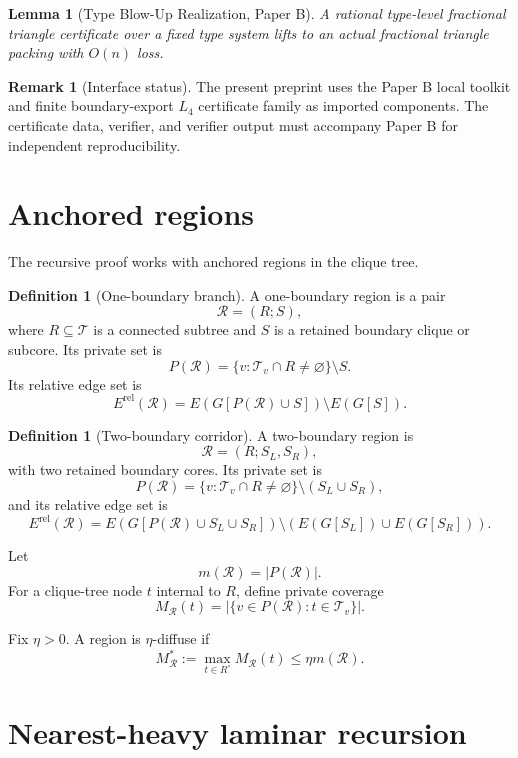 \documentclass[11pt]{article}
\newtheorem{lemma}[theorem]{Lemma}
\theoremstyle{definition}
\newtheorem{definition}[theorem]{Definition}
\newtheorem{remark}[theorem]{Remark}
\newcommand{\calT}{\mathcal T}
\newcommand{\calR}{\mathcal R}
\newcommand{\rel}{\mathrm{rel}}
\begin{document}
\begin{lemma}[Type Blow-Up Realization, Paper B]\label{lem:import-blowup}
A rational type-level fractional triangle certificate over a fixed type system lifts to an actual fractional triangle packing with \(O(n)\) loss.
\end{lemma}

\begin{remark}[Interface status]
The present preprint uses the Paper B local toolkit and finite boundary-export \(L_4\) certificate family as imported components. The certificate data, verifier, and verifier output must accompany Paper B for independent reproducibility.
\end{remark}

\section{Anchored regions}

The recursive proof works with anchored regions in the clique tree.

\begin{definition}[One-boundary branch]
A one-boundary region is a pair
\[
    \calR=(R;S),
\]
where \(R\subseteq\calT\) is a connected subtree and \(S\) is a retained boundary clique or subcore. Its private set is
\[
    P(\calR)
    =
    \{v:\calT_v\cap R\neq\varnothing\}\setminus S.
\]
Its relative edge set is
\[
    E^{\rel}(\calR)
    =
    E(G[P(\calR)\cup S])\setminus E(G[S]).
\]
\end{definition}

\begin{definition}[Two-boundary corridor]
A two-boundary region is
\[
    \calR=(R;S_L,S_R),
\]
with two retained boundary cores. Its private set is
\[
    P(\calR)
    =
    \{v:\calT_v\cap R\neq\varnothing\}
    \setminus(S_L\cup S_R),
\]
and its relative edge set is
\[
    E^{\rel}(\calR)
    =
    E(G[P(\calR)\cup S_L\cup S_R])
    \setminus
    \left(E(G[S_L])\cup E(G[S_R])\right).
\]
\end{definition}

Let
\[
    m(\calR)=|P(\calR)|.
\]
For a clique-tree node \(t\) internal to \(R\), define private coverage
\[
    M_{\calR}(t)
    =
    |\{v\in P(\calR):t\in\calT_v\}|.
\]

Fix \(\eta>0\). A region is \(\eta\)-diffuse if
\[
    M_{\calR}^*
    :=
    \max_{t\in R^\circ}M_{\calR}(t)
    \le
    \eta m(\calR).
\]

\section{Nearest-heavy laminar recursion}
\end{document}
